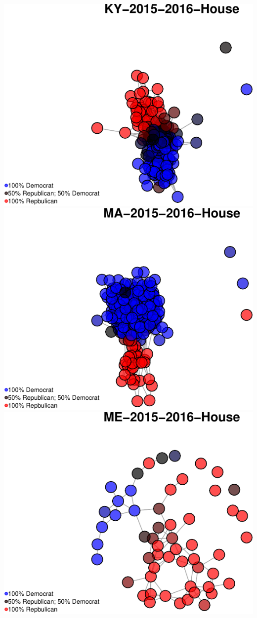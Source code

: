 \documentclass[]{article}
\begin{document}
\includegraphics{Final_Project_RMarkdown_Updated_files/figure-latex/unnamed-chunk-10-16.pdf}
\includegraphics{Final_Project_RMarkdown_Updated_files/figure-latex/unnamed-chunk-10-17.pdf}
\includegraphics{Final_Project_RMarkdown_Updated_files/figure-latex/unnamed-chunk-10-18.pdf}
\end{document}
